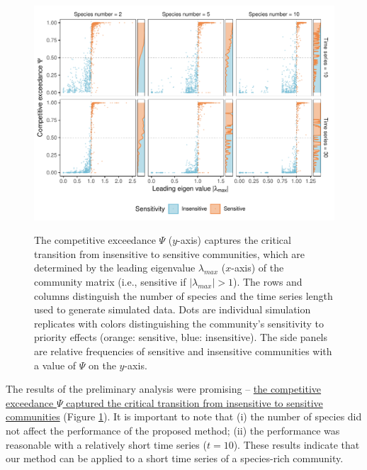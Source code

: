 \documentclass[12pt, class=article, crop=false]{standalone}
\begin{document}
\begin{figure}
    \caption{The competitive exceedance $\Psi$ ($y$-axis) captures the critical transition from insensitive to sensitive communities, which are determined by the leading eigenvalue $\lambda_{max}$ ($x$-axis) of the community matrix (i.e., sensitive if $|\lambda_{max}| > 1$).
    The rows and columns distinguish the number of species and the time series length used to generate simulated data.
    Dots are individual simulation replicates with colors distinguishing the community's sensitivity to priority effects (orange: sensitive, blue: insensitive).
    The side panels are relative frequencies of sensitive and insensitive communities with a value of $\Psi$ on the $y$-axis.}
    \includegraphics[scale=0.65]{output/figure_eigen_scatter.pdf}
    \label{fig:box}
\end{figure}

The results of the preliminary analysis were promising -- \ul{the competitive exceedance $\Psi$ captured the critical transition from insensitive to sensitive communities} (Figure \ref{fig:box}). It is important to note that (i) the number of species did not affect the performance of the proposed method; (ii) the performance was reasonable with a relatively short time series ($t = 10$).
These results indicate that our method can be applied to a short time series of a species-rich community. 
\end{document}
